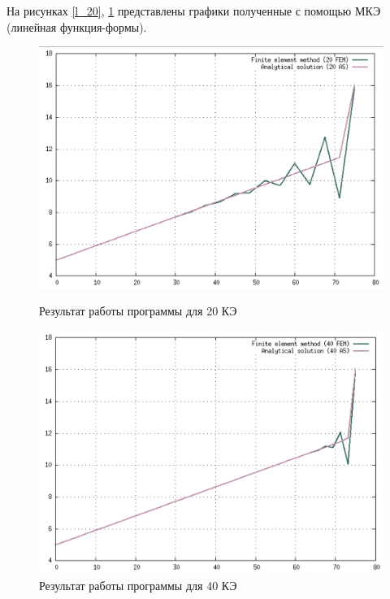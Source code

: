 {{{{{На рисунках \ref{l_20}, \ref{l_40} представлены графики полученные с помощью МКЭ (линейная функция-формы).

\begin{figure}[!h]
    \centering
    \begin{minipage}{0.5\textwidth}
        \centering
        \includegraphics[width=1\textwidth]{labs/img/lin/20.png} %
        \caption{Результат работы программы для 20 КЭ}
        \label{l_20}
    \end{minipage}\hfill
    \begin{minipage}{0.5\textwidth}
        \centering
        \includegraphics[width=1\textwidth]{labs/img/lin/40.png} %
        \caption{Результат работы программы для 40 КЭ}
        \label{l_40}
    \end{minipage}
\end{figure}

}}}}}
